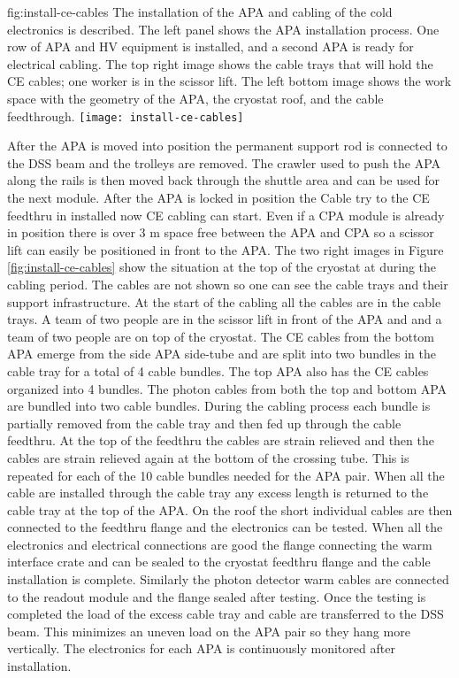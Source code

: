 \begin{dunefigure}{fig:install-ce-cables}
  {The installation of the APA and cabling of the cold electronics is described. The left panel shows the APA installation process. One row of APA and HV equipment is installed, and a second APA is ready for electrical cabling. The top right image shows the cable trays that will hold the CE cables; one worker is in the scissor lift. The left bottom image shows the work space with the geometry of the APA, the cryostat roof, and the cable feedthrough.}
\texttt{[image: install-ce-cables]}
\end{dunefigure}

After the APA is moved into position the permanent support rod is connected to the DSS beam and the trolleys are removed. 
The crawler used to push the APA along the rails is then moved back through the shuttle area and can be used for the next module. 
After the APA is locked in position the Cable try to the CE feedthru in installed now CE cabling can start. 
Even if a CPA module is already in position there is over 3 \si{m} space free between the APA and CPA so a scissor lift can easily be positioned in front to the APA. 
The two right images in Figure \ref{fig:install-ce-cables} show the situation at the top of the cryostat at during the cabling period. 
The cables are not shown so one can see the cable trays and their support infrastructure. 
At the start of the cabling all the cables are in the cable trays. 
A team of two people are in the scissor lift in front of the APA and  and a team of two people are on top of the cryostat. 
The CE cables from the bottom APA emerge from the side APA side-tube and are split into two bundles in the cable tray for a total of 4 cable bundles. 
The top APA also has the CE cables organized into 4 bundles. 
The photon cables from both the top and bottom APA are bundled into two cable bundles.
During the cabling process each bundle is partially removed from the cable tray and then fed up through the cable feedthru. 
At the top of the feedthru the cables are strain relieved and then the cables are strain relieved again at the bottom of the crossing tube.
This is repeated for each of the 10 cable bundles needed for the APA pair. 
When all the cable are installed through the cable tray any excess length is returned to the cable tray at the top of the APA. 
On the roof the short individual cables are then connected to the feedthru flange and the electronics can be tested. 
When all the electronics and electrical connections are good the flange connecting the warm interface crate and can be sealed to the cryostat feedthru flange and the cable installation is complete. Similarly the photon detector warm cables are connected to the readout module and the flange sealed after testing.  Once the testing is completed the load of the excess cable tray and cable are transferred to the DSS beam.  This minimizes an uneven load on the APA pair so they hang more vertically.   
The electronics for each APA is continuously monitored after installation. 

